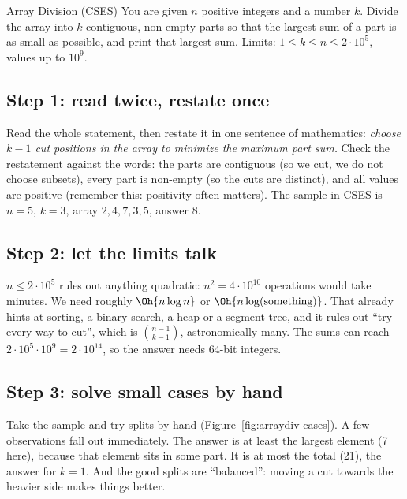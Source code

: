 \begin{problem}{Array Division (CSES)}
You are given $n$ positive integers and a number $k$. Divide the array into $k$ contiguous, non-empty parts so that the
largest sum of a part is as small as possible, and print that largest sum. Limits: $1 \le k \le n \le 2 \cdot 10^5$,
values up to $10^9$.
\end{problem}

\subsection{Step 1: read twice, restate once}

Read the whole statement, then restate it in one sentence of mathematics: \emph{choose $k - 1$ cut positions in the array
to minimize the maximum part sum.} Check the restatement against the words: the parts are contiguous (so we cut, we do not
choose subsets), every part is non-empty (so the cuts are distinct), and all values are positive (remember this: positivity
often matters). The sample in CSES is $n = 5$, $k = 3$, array $2, 4, 7, 3, 5$, answer 8.

\subsection{Step 2: let the limits talk}

$n \le 2 \cdot 10^5$ rules out anything quadratic: $n^2 = 4 \cdot 10^{10}$ operations would take minutes. We need roughly
$\Oh{n \log n}$ or $\Oh{n \log(\text{something})}$. That already hints at sorting, a binary search, a heap or a segment
tree, and it rules out ``try every way to cut'', which is $\binom{n-1}{k-1}$, astronomically many. The sums can reach
$2 \cdot 10^5 \cdot 10^9 = 2 \cdot 10^{14}$, so the answer needs 64-bit integers.

\subsection{Step 3: solve small cases by hand}

Take the sample and try splits by hand (Figure~\ref{fig:arraydiv-cases}). A few observations fall out immediately. The
answer is at least the largest element (7 here), because that element sits in some part. It is at most the total (21),
the answer for $k = 1$. And the good splits are ``balanced'': moving a cut towards the heavier side makes things better.

